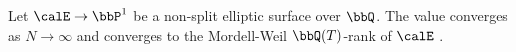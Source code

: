\begin{conjecture} \label{conjecture:nagaos_conjecture_on_the_mordell_weil_rank_of_elliptic_curves_over_Q_T}
    Let $\calE \to \bbP^1$ be a non-split elliptic surface over $\bbQ$. The value  converges as $N \to \infty$ and converges to the Mordell-Weil $\bbQ(T)$-rank of $\calE$ .
\end{conjecture}